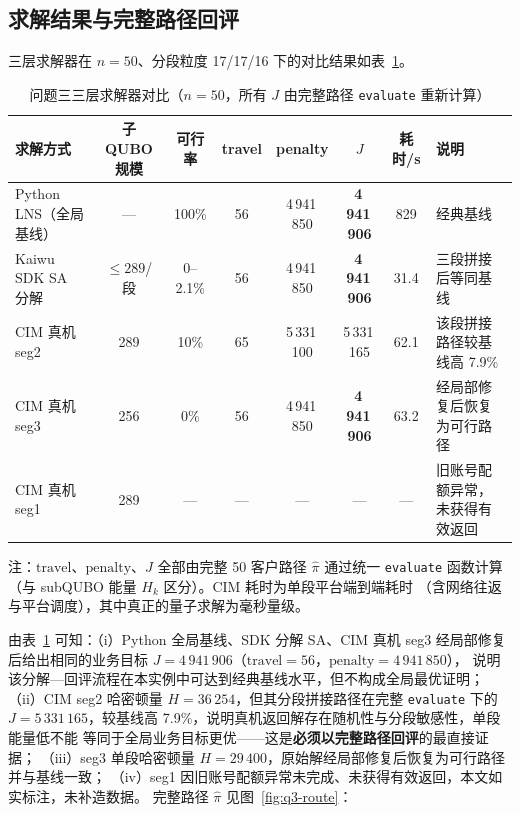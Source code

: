 \documentclass[UTF8,12pt,a4paper]{ctexart}
\begin{document}
\subsection{求解结果与完整路径回评}
\label{subsec:q3-result}

三层求解器在 $n=50$、分段粒度 17/17/16 下的对比结果如表~\ref{tab:q3-cmp}。

\begin{table}[H]
  \centering
  \caption{问题三三层求解器对比（$n=50$，所有 $J$ 由完整路径 \texttt{evaluate} 重新计算）}
  \label{tab:q3-cmp}
  \footnotesize
  \begin{tabular}{lccccccl}
    \toprule
    求解方式 & 子 QUBO 规模 & 可行率 & travel & penalty & $J$ & 耗时/s & 说明 \\
    \midrule
    Python LNS（全局基线）  & ---            & 100\%  & 56 & 4\,941\,850 & \textbf{4\,941\,906} & 829   & 经典基线 \\
    Kaiwu SDK SA 分解       & $\le 289$/段   & 0--2.1\% & 56 & 4\,941\,850 & \textbf{4\,941\,906} & 31.4  & 三段拼接后等同基线 \\
    CIM 真机 seg2           & 289           & 10\%    & 65 & 5\,331\,100 & 5\,331\,165         & 62.1  & 该段拼接路径较基线高 7.9\% \\
    CIM 真机 seg3           & 256           & 0\%    & 56 & 4\,941\,850 & \textbf{4\,941\,906} & 63.2  & 经局部修复后恢复为可行路径 \\
    CIM 真机 seg1           & 289           & ---    & --- & ---        & ---                 & ---   & 旧账号配额异常，未获得有效返回 \\
    \bottomrule
  \end{tabular}
  \begin{flushleft}\footnotesize
  注：$\mathrm{travel}$、$\mathrm{penalty}$、$J$ 全部由完整 50 客户路径 $\hat\pi$ 通过统一
  \texttt{evaluate} 函数计算（与 subQUBO 能量 $H_k$ 区分）。CIM 耗时为单段平台端到端耗时
  （含网络往返与平台调度），其中真正的量子求解为毫秒量级。
  \end{flushleft}
\end{table}

由表~\ref{tab:q3-cmp} 可知：（i）Python 全局基线、SDK 分解 SA、CIM 真机 seg3 经局部修复
后给出相同的业务目标 $J=4\,941\,906$（$\mathrm{travel}=56$，$\mathrm{penalty}=4\,941\,850$），
说明该分解—回评流程在本实例中可达到经典基线水平，但不构成全局最优证明；
（ii）CIM seg2 哈密顿量 $H=36\,254$，但其分段拼接路径在完整 \texttt{evaluate} 下的
$J=5\,331\,165$，较基线高 7.9\%，说明真机返回解存在随机性与分段敏感性，单段能量低不能
等同于全局业务目标更优——这是\textbf{必须以完整路径回评}的最直接证据；
（iii）seg3 单段哈密顿量 $H=29\,400$，原始解经局部修复后恢复为可行路径并与基线一致；
（iv）seg1 因旧账号配额异常未完成、未获得有效返回，本文如实标注，未补造数据。
完整路径 $\hat\pi$ 见图~\ref{fig:q3-route}：
\end{document}

